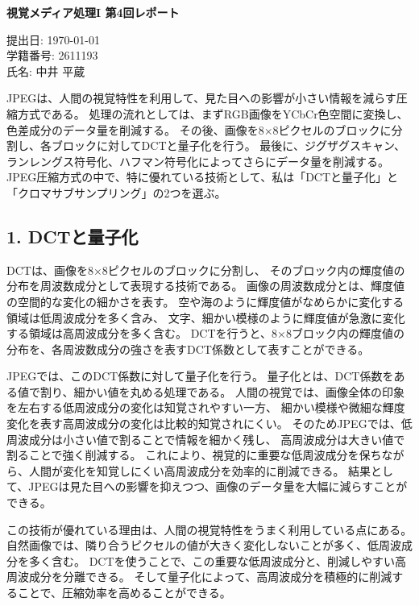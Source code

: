\documentclass[11pt,a4paper]{ltjsarticle}
\begin{document}
\begin{center}
{\LARGE \textbf{視覚メディア処理I 第4回レポート}}
\end{center}
\vspace{1em}

\begin{flushright}
提出日: \today \\
学籍番号: 2611193 \\
氏名: 中井 平蔵
\end{flushright}

JPEGは、人間の視覚特性を利用して、見た目への影響が小さい情報を減らす圧縮方式である。
処理の流れとしては、まずRGB画像をYCbCr色空間に変換し、色差成分のデータ量を削減する。
その後、画像を8×8ピクセルのブロックに分割し、各ブロックに対してDCTと量子化を行う。
最後に、ジグザグスキャン、ランレングス符号化、ハフマン符号化によってさらにデータ量を削減する。
JPEG圧縮方式の中で、特に優れている技術として、私は「DCTと量子化」と「クロマサブサンプリング」の2つを選ぶ。

\subsection*{1. DCTと量子化}

DCTは、画像を8×8ピクセルのブロックに分割し、
そのブロック内の輝度値の分布を周波数成分として表現する技術である。
画像の周波数成分とは、輝度値の空間的な変化の細かさを表す。
空や海のように輝度値がなめらかに変化する領域は低周波成分を多く含み、
文字、細かい模様のように輝度値が急激に変化する領域は高周波成分を多く含む。
DCTを行うと、8×8ブロック内の輝度値の分布を、各周波数成分の強さを表すDCT係数として表すことができる。

JPEGでは、このDCT係数に対して量子化を行う。
量子化とは、DCT係数をある値で割り、細かい値を丸める処理である。
人間の視覚では、画像全体の印象を左右する低周波成分の変化は知覚されやすい一方、
細かい模様や微細な輝度変化を表す高周波成分の変化は比較的知覚されにくい。
そのためJPEGでは、低周波成分は小さい値で割ることで情報を細かく残し、
高周波成分は大きい値で割ることで強く削減する。
これにより、視覚的に重要な低周波成分を保ちながら、人間が変化を知覚しにくい高周波成分を効率的に削減できる。
結果として、JPEGは見た目への影響を抑えつつ、画像のデータ量を大幅に減らすことができる。

この技術が優れている理由は、人間の視覚特性をうまく利用している点にある。
自然画像では、隣り合うピクセルの値が大きく変化しないことが多く、低周波成分を多く含む。
DCTを使うことで、この重要な低周波成分と、削減しやすい高周波成分を分離できる。
そして量子化によって、高周波成分を積極的に削減することで、圧縮効率を高めることができる。
\end{document}
